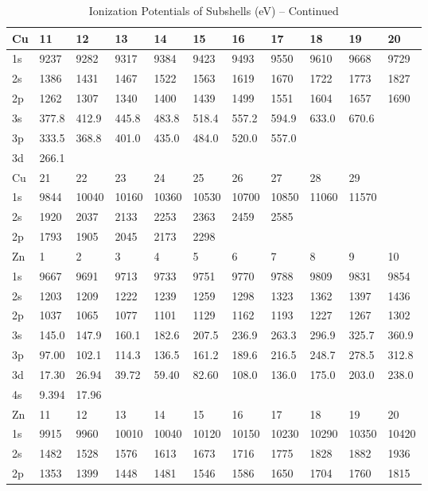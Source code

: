 \begin{table}
\begin{center}
\addtocounter{table}{-1}
\caption{Ionization Potentials of Subshells (eV) -- Continued}
\begin{tabular}{lllllllllll}
\hline
Cu&  11&  12&  13&  14&  15&  16&  17&  18&  19&  20\\
\hline
1s&  9237&  9282&  9317&  9384&  9423&
9493&  9550&  9610&  9668&  9729\\
2s&  1386&  1431&  1467&  1522&  1563&  1619&  1670&
1722&  1773&  1827\\
2p&  1262&  1307&  1340&  1400&  1439&  1499&  1551&  1604&  1657&
1690\\
3s& 377.8& 412.9& 445.8& 483.8& 518.4& 557.2& 594.9& 633.0& 670.6\\
3p& 333.5&
368.8&
401.0& 435.0& 484.0& 520.0& 557.0\\
3d& 266.1\\
\hline
Cu&  21&  22&  23&  24&  25&  26&  27&  28&
29\\
\hline
1s&  9844& 10040& 10160& 10360& 10530& 10700& 10850& 11060& 11570\\
2s&  1920&  2037&
2133&  2253&  2363&  2459&  2585\\
2p&  1793&  1905&  2045&  2173&  2298\\
\hline
Zn&   1&   2&
3&  4&   5&   6&   7&   8&   9&  10\\
\hline
1s&  9667&  9691&  9713&  9733&  9751&  9770&  9788&
9809&  9831&  9854\\
2s&  1203&  1209&  1222&  1239&  1259&  1298&  1323&  1362&  1397&
1436\\
2p&  1037&  1065&  1077&  1101&  1129&  1162&  1193&  1227&  1267&  1302\\
3s&
145.0&
147.9& 160.1& 182.6& 207.5& 236.9& 263.3& 296.9& 325.7& 360.9\\
3p& 97.00&
102.1& 114.3&
136.5& 161.2& 189.6& 216.5& 248.7& 278.5& 312.8\\
3d& 17.30& 26.94& 39.72& 59.40& 82.60&
108.0& 136.0& 175.0& 203.0& 238.0\\
4s& 9.394& 17.96\\
\hline
Zn&  11&  12&  13&  14&  15&  16&  17&
18&  19&  20\\
\hline
1s&  9915&  9960& 10010& 10040& 10120& 10150& 10230& 10290& 10350& 10420\\
2s&
1482&  1528&  1576&  1613&  1673&  1716&  1775&  1828&  1882&  1936\\
2p&
1353&  1399&
1448&  1481&  1546&  1586&  1650&  1704&  1760&  1815\\

\end{tabular}
\end{center}
\end{table}
